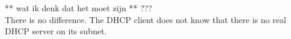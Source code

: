 ** wat ik denk dat het moet zijn ** ??? \\
There is no difference. The DHCP client does not know that there is no real DHCP server on its subnet.
